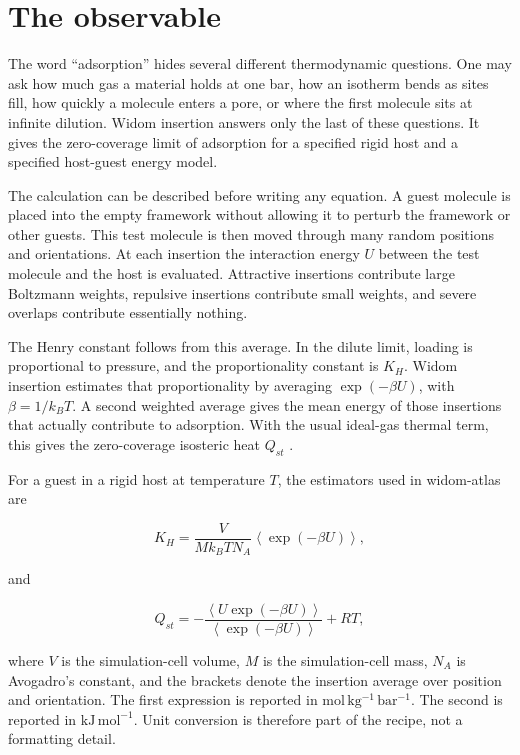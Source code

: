 \section{The observable}\label{sec:observable}

The word ``adsorption'' hides several different thermodynamic questions. One may ask how much gas a material holds at one bar, how an isotherm bends as sites fill, how quickly a molecule enters a pore, or where the first molecule sits at infinite dilution. Widom insertion answers only the last of these questions. It gives the zero-coverage limit of adsorption for a specified rigid host and a specified host-guest energy model.

The calculation can be described before writing any equation. A guest molecule is placed into the empty framework without allowing it to perturb the framework or other guests. This test molecule is then moved through many random positions and orientations. At each insertion the interaction energy \(U\) between the test molecule and the host is evaluated. Attractive insertions contribute large Boltzmann weights, repulsive insertions contribute small weights, and severe overlaps contribute essentially nothing.

The Henry constant follows from this average. In the dilute limit, loading is proportional to pressure, and the proportionality constant is \(K_H\). Widom insertion estimates that proportionality by averaging \(\exp(-\beta U)\), with \(\beta = 1/k_B T\). A second weighted average gives the mean energy of those insertions that actually contribute to adsorption. With the usual ideal-gas thermal term, this gives the zero-coverage isosteric heat \(Q_{st}\) \cite{FrenkelSmit2002}.

For a guest in a rigid host at temperature \(T\), the estimators used in widom-atlas are

\[
K_H =
\frac{V}{M k_B T N_A}
\left\langle \exp(-\beta U)\right\rangle,
\]

and

\[
Q_{st}
=
-\frac{
\left\langle U \exp(-\beta U)\right\rangle
}{
\left\langle \exp(-\beta U)\right\rangle
}
+ RT,
\]

where \(V\) is the simulation-cell volume, \(M\) is the simulation-cell mass, \(N_A\) is Avogadro's constant, and the brackets denote the insertion average over position and orientation. The first expression is reported in \(\mathrm{mol\,kg^{-1}\,bar^{-1}}\). The second is reported in \(\mathrm{kJ\,mol^{-1}}\). Unit conversion is therefore part of the recipe, not a formatting detail.

